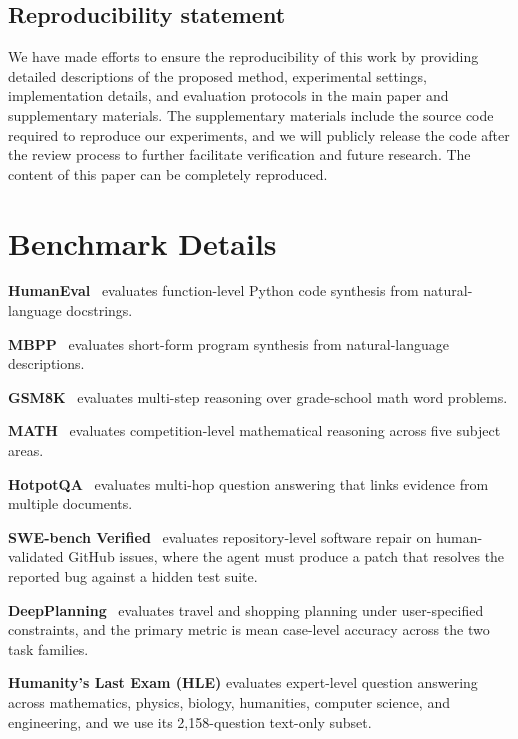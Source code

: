 \documentclass{article} %
\begin{document}
\subsection*{Reproducibility statement}

We have made efforts to ensure the reproducibility of this work by providing detailed descriptions of the proposed method, experimental settings, implementation details, and evaluation protocols in the main paper and supplementary materials. The supplementary materials include the source code required to reproduce our experiments, and we will publicly release the code after the review process to further facilitate verification and future research. The content of this paper can be completely reproduced.




\appendix

\clearpage
\section{Benchmark Details}
\label{app:benchmarks}

\textbf{HumanEval}~\citep{chen2021humaneval} evaluates function-level Python code synthesis from natural-language docstrings.

\textbf{MBPP}~\citep{austin2021mbpp} evaluates short-form program synthesis from natural-language descriptions.

\textbf{GSM8K}~\citep{cobbe2021gsm8k} evaluates multi-step reasoning over grade-school math word problems.

\textbf{MATH}~\citep{hendrycks2021math} evaluates competition-level mathematical reasoning across five subject areas.

\textbf{HotpotQA}~\citep{yang2018hotpotqa} evaluates multi-hop question answering that links evidence from multiple documents.

\textbf{SWE-bench Verified}~\citep{jimenez2024swebench} evaluates repository-level software repair on human-validated GitHub issues, where the agent must produce a patch that resolves the reported bug against a hidden test suite.

\textbf{DeepPlanning}~\citep{zhang2026deepplanning} evaluates travel and shopping planning under user-specified constraints, and the primary metric is mean case-level accuracy across the two task families.

\textbf{Humanity's Last Exam (HLE)} evaluates expert-level question answering across mathematics, physics, biology, humanities, computer science, and engineering, and we use its 2{,}158-question text-only subset.
\end{document}
